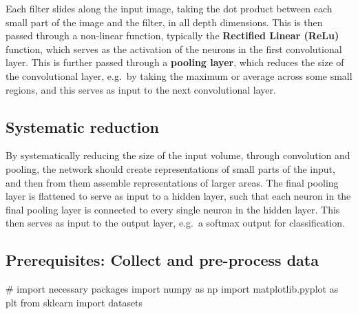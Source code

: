 \documentclass[%
oneside,                 %
final,                   %
10pt]{article}
\begin{document}
Each filter slides along the input image, taking the dot product
between each small part of the image and the filter, in all depth
dimensions. This is then passed through a non-linear function,
typically the \textbf{Rectified Linear (ReLu)} function, which serves as the
activation of the neurons in the first convolutional layer. This is
further passed through a \textbf{pooling layer}, which reduces the size of the
convolutional layer, e.g.~by taking the maximum or average across some
small regions, and this serves as input to the next convolutional
layer.

\subsection{Systematic reduction}

By systematically reducing the size of the input volume, through
convolution and pooling, the network should create representations of
small parts of the input, and then from them assemble representations
of larger areas.  The final pooling layer is flattened to serve as
input to a hidden layer, such that each neuron in the final pooling
layer is connected to every single neuron in the hidden layer. This
then serves as input to the output layer, e.g.~a softmax output for
classification.


\subsection{Prerequisites: Collect and pre-process data}









































\bpycod
# import necessary packages
import numpy as np
import matplotlib.pyplot as plt
from sklearn import datasets
\end{document}
